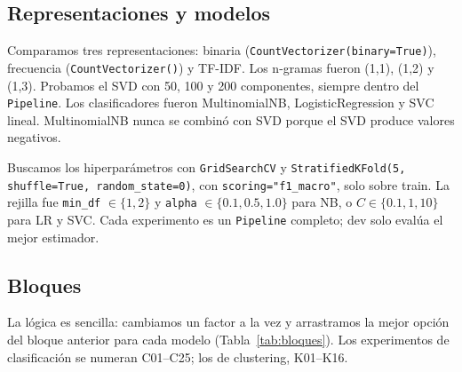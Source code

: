 \documentclass[11pt,a4paper]{article}
\newcommand{\code}[1]{\texttt{#1}}
\begin{document}
\subsection{Representaciones y modelos}
Comparamos tres representaciones: binaria (\code{CountVectorizer(binary=True)}),
frecuencia (\code{CountVectorizer()}) y TF-IDF. Los n-gramas fueron (1,1), (1,2) y (1,3).
Probamos el SVD con 50, 100 y 200 componentes, siempre dentro del \code{Pipeline}. Los
clasificadores fueron MultinomialNB, LogisticRegression y SVC lineal. MultinomialNB nunca
se combinó con SVD porque el SVD produce valores negativos.

Buscamos los hiperparámetros con \code{GridSearchCV} y
\code{StratifiedKFold(5, shuffle=True, random\_state=0)}, con \code{scoring="f1\_macro"},
solo sobre train. La rejilla fue \code{min\_df} $\in \{1,2\}$ y \code{alpha} $\in
\{0.1,0.5,1.0\}$ para NB, o $C \in \{0.1,1,10\}$ para LR y SVC. Cada experimento es un
\code{Pipeline} completo; dev solo evalúa el mejor estimador.

\subsection{Bloques}
La lógica es sencilla: cambiamos un factor a la vez y arrastramos la mejor opción del
bloque anterior para cada modelo (Tabla~\ref{tab:bloques}). Los experimentos de
clasificación se numeran C01--C25; los de clustering, K01--K16.
\end{document}
